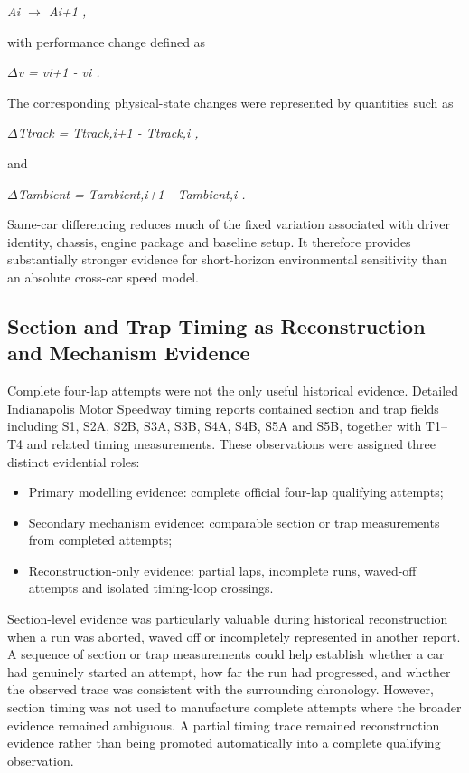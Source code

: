 \begin{center}\textit{Ai \ensuremath{\rightarrow} Ai+1 ,}\end{center}

with performance change defined as

\begin{center}\textit{\ensuremath{\Delta}v = vi+1 - vi .}\end{center}

The corresponding physical-state changes were represented by quantities such as

\begin{center}\textit{\ensuremath{\Delta}Ttrack = Ttrack,i+1 - Ttrack,i ,}\end{center}

and

\begin{center}\textit{\ensuremath{\Delta}Tambient = Tambient,i+1 - Tambient,i .}\end{center}

Same-car differencing reduces much of the fixed variation associated with driver identity, chassis, engine package and baseline setup. It therefore provides substantially stronger evidence for short-horizon environmental sensitivity than an absolute cross-car speed model.

\subsection{Section and Trap Timing as Reconstruction and Mechanism Evidence}
Complete four-lap attempts were not the only useful historical evidence. Detailed Indianapolis Motor Speedway timing reports contained section and trap fields including S1, S2A, S2B, S3A, S3B, S4A, S4B, S5A and S5B, together with T1--T4 and related timing measurements. These observations were assigned three distinct evidential roles:

\begin{itemize}
\item Primary modelling evidence: complete official four-lap qualifying attempts;
\item Secondary mechanism evidence: comparable section or trap measurements from completed attempts;
\item Reconstruction-only evidence: partial laps, incomplete runs, waved-off attempts and isolated timing-loop crossings.
\end{itemize}

Section-level evidence was particularly valuable during historical reconstruction when a run was aborted, waved off or incompletely represented in another report. A sequence of section or trap measurements could help establish whether a car had genuinely started an attempt, how far the run had progressed, and whether the observed trace was consistent with the surrounding chronology. However, section timing was not used to manufacture complete attempts where the broader evidence remained ambiguous. A partial timing trace remained reconstruction evidence rather than being promoted automatically into a complete qualifying observation.

